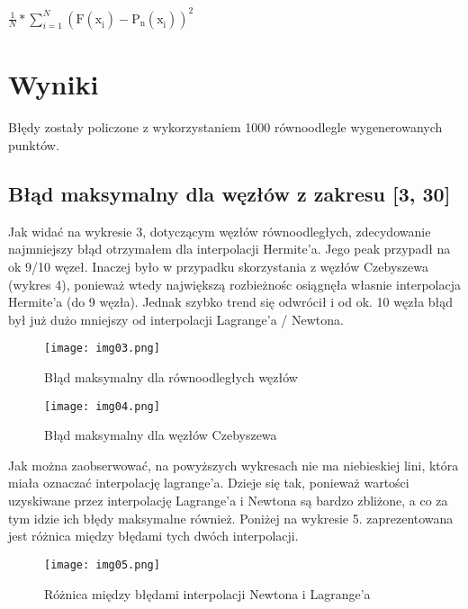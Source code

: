 \documentclass{article}
\begin{document}
\begin{center}
\(\frac{1}{N} * \sum_{i = 1}^{N}\mathrm{(F(\mathrm{x}_{i}^{}) - \mathrm{P}_{n}^{}(\mathrm{x}_{i}^{}))}_{}^{2}\)
\end{center}

\section{Wyniki}

Błędy zostały policzone z wykorzystaniem 1000 równoodlegle wygenerowanych punktów.

\subsection{Błąd maksymalny dla węzłów z zakresu [3, 30]}

Jak widać na wykresie 3, dotyczącym węzłów równoodległych, zdecydowanie najmniejszy błąd otrzymałem dla interpolacji Hermite'a. Jego peak przypadł na ok 9/10 węzeł. Inaczej było w przypadku skorzystania z węzłów Czebyszewa (wykres 4), ponieważ wtedy największą rozbieżnośc osiągnęła własnie interpolacja Hermite'a (do 9 węzła). Jednak szybko trend się odwrócił i od ok. 10 węzła błąd był już dużo mniejszy od interpolacji Lagrange'a / Newtona.

\begin{figure}[H]
  \begin{minipage}[b]{0.49\textwidth}
    \texttt{[image: img03.png]}
    \caption{Błąd maksymalny dla równoodległych węzłów}
  \end{minipage}
  \hfill
  \begin{minipage}[b]{0.49\textwidth}
    \texttt{[image: img04.png]}
    \caption{Błąd maksymalny dla węzłów Czebyszewa}
  \end{minipage}
\end{figure}

Jak można zaobserwować, na powyższych wykresach nie ma niebieskiej lini, która miała oznaczać interpolację lagrange'a. Dzieje się tak, ponieważ wartości uzyskiwane przez interpolację Lagrange'a i Newtona są bardzo zbliżone, a co za tym idzie ich błędy maksymalne również. Poniżej na wykresie 5. zaprezentowana jest różnica między błędami tych dwóch interpolacji.

\begin{figure}[H]
  \centering
  \begin{minipage}[b]{0.93\textwidth}
    \texttt{[image: img05.png]}
    \caption{Różnica między błędami interpolacji Newtona i Lagrange'a}
  \end{minipage}
\end{figure}
\end{document}
